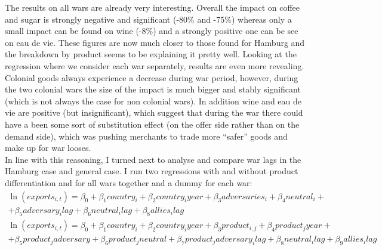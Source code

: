 \documentclass[12pt,a4paper,titlepage]{article}
\begin{document}
The results on all wars are already very interesting. Overall the impact on coffee and sugar is strongly negative and significant (-80\% and -75\%) whereas only a small impact can be found on wine (-8\%) and a strongly positive one can be see on eau de vie. These figures are now much closer to those found for Hamburg and the breakdown by product seems to be explaining it pretty well. Looking at the regression where we consider each war separately, results are even more revealing. Colonial goods always experience a decrease during war period, however, during the two colonial wars the size of the impact is much bigger and stably significant (which is not always the case for non colonial wars). In addition wine and eau de vie are positive (but insignificant), which suggest that during the war there could have a been some sort of substitution effect (on the offer side rather than on the demand side), which was pushing merchants to trade more “safer” goods and make up for war looses.\\
In line with this reasoning, I turned next to analyse and compare war lags in the Hamburg case and general case. I run two regressions with and without product differentiation and for all wars together and a dummy for each war: 
\begin{multline}
\ln(exports_{i,t})=\beta_0+\beta_1country_i+\beta_2country_iyear+\beta_3adversaries_i+\beta_4neutral_i+\\+\beta_5adversary_ilag+\beta_6neutral_ilag+\beta_8allies_ilag
\end{multline}
\begin{multline}
\ln(exports_{i,t})=\beta_0+\beta_1country_i+\beta_2country_iyear+\beta_3product_{i,j}+\beta_4product_jyear+\\+\beta_5product_jadversary+ \beta_6product_jneutral+\beta_7product_jadversary_ilag+\beta_8neutral_ilag+\beta_9allies_ilag
\end{multline}
\end{document}
